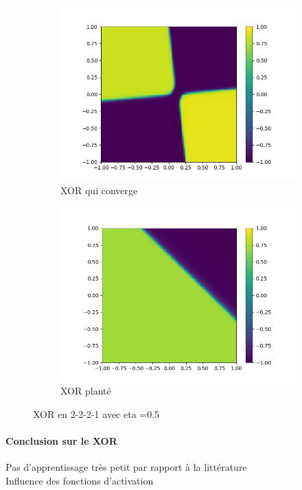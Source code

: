 \begin{figure}[h!]
  \centering
  \begin{subfigure}[b]{.4\linewidth}
    \includegraphics[width=\linewidth]{fig/xor2221_eta05.png}
    \caption{XOR qui converge}
    \label{fig:struct221}
  \end{subfigure}
  \quad
  \begin{subfigure}[b]{.4\linewidth}
    \includegraphics[width=\linewidth]{fig/xor2221_eta05v2.png}
    \caption{XOR planté}
  \end{subfigure}
  \caption{XOR en 2-2-2-1 avec eta =0.5}
  \label{fig:2_2_2_1_instable}
\end{figure}

\paragraph{Conclusion sur le XOR} %
\label{par:conclusion_sur_le_xor}
Pas d'apprentissage très petit par rapport à la littérature\\
Influence des fonctions d'activation

